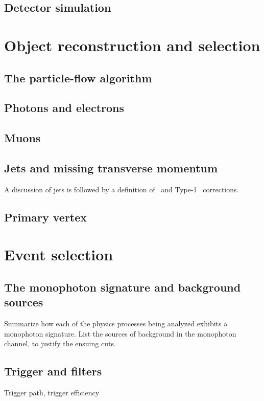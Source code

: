 \documentclass[oneside, letterpaper, 12pt, oldfontcommands]{memoir}
\begin{document}
\section{Detector simulation} \label{sec:simulation_detector}

\chapter{Object reconstruction and selection} \label{chap:reconstruction}
\section{The particle-flow algorithm} \label{sec:reconstruction_particle_flow}
\section{Photons and electrons} \label{sec:reconstruction_egamma}
\section{Muons} \label{sec:reconstruction_muons}
\section{Jets and missing transverse momentum} \label{sec:reconstruction_jetmet}
A discussion of jets is followed by a definition of \MET\ and Type-1 \MET\ corrections.
\section{Primary vertex} \label{sec:reconstruction_pv}

\chapter{Event selection} \label{chap:event_selection}
\section{The monophoton signature and background sources} \label{sec:event_selection_backgrounds}
Summarize how each of the physics processes being analyzed exhibits a monophoton signature.
List the sources of background in the monophoton channel, to justify the ensuing cuts.
\section{Trigger and \texorpdfstring{\MET}{pTmiss} filters} \label{sec:event_selection_trigger_METfilters}
Trigger path, trigger efficiency
\end{document}
